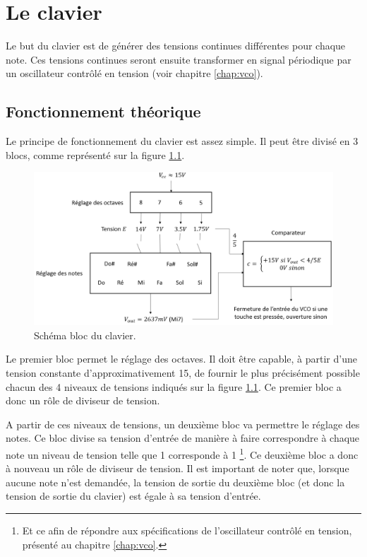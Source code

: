 \chapter{Le clavier}
Le but du clavier est de générer des tensions continues
différentes pour chaque note. Ces tensions continues
seront ensuite transformer en signal périodique par un
oscillateur contrôlé en tension (voir chapitre \ref{chap:vco}).

\section{Fonctionnement théorique}
Le principe de fonctionnement du clavier est assez simple.
Il peut être divisé en 3 blocs, comme représenté sur la
figure \ref{fig:keyboard-bloc}.

\begin{figure}[ht]
	\centering
	\includegraphics[scale=0.6]{img-keyboard/bloc.png}
	\caption{Schéma bloc du clavier.}
	\label{fig:keyboard-bloc}
\end{figure}

Le premier bloc permet le réglage des octaves. Il doit
être capable, à partir d'une tension constante d'approximativement
\unit{15}{\volt}, de fournir le plus précisément possible chacun 
des 4 niveaux de tensions indiqués sur la figure \ref{fig:keyboard-bloc}.
Ce premier bloc a donc un rôle de diviseur de tension.

A partir de ces niveaux de tensions, un deuxième bloc va
permettre le réglage des notes. Ce bloc divise sa tension d'entrée
de manière à faire correspondre à chaque note un niveau de tension
telle que \unit{1}{\milli\volt} corresponde à \unit{1}{\hertz}
\footnote{Et ce afin de répondre aux spécifications de l'oscillateur
contrôlé en tension, présenté au chapitre \ref{chap:vco}.}. Ce deuxième
bloc a donc à nouveau un rôle de diviseur de tension. Il est important
de noter que, lorsque aucune note n'est demandée, la tension de sortie
du deuxième bloc (et donc la tension de sortie du clavier) est égale à
sa tension d'entrée.

